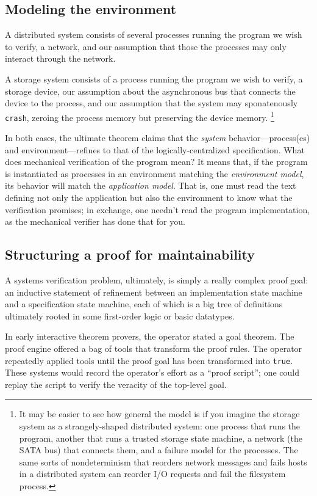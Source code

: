 \subsection{Modeling the environment}

A distributed system consists of several processes running
the program we wish to verify,
a network,
and our assumption that those the processes may only interact through
the network.

A storage system consists of a process running the program
we wish to verify,
a storage device,
our assumption about the asynchronous bus that connects the
device to the process,
and our assumption that the system may sponatenously \texttt{crash},
zeroing the process memory but preserving the device memory.
\footnote{
It may be easier to see how general the model is if you imagine
the storage system as a strangely-shaped distributed system:
one process that runs the program,
another that runs a trusted storage state machine,
a network (the SATA bus) that connects them,
and a failure model for the processes.
The same sorts of nondeterminism that reorders network messages and fails
hosts in a distributed system
can reorder I/O requests and fail the filesystem process.
}

In both cases, the ultimate theorem claims that the
\textit{system} behavior---process(es) and environment---refines
to that of the logically-centralized specification.
What does mechanical verification of the program mean?
It means that, if the program is instantiated as processes in an
environment matching the \textit{environment model},
its behavior will match the \textit{application model}.
That is, one must read the text defining not only the application
but also the environment to know what the verification promises;
in exchange, one needn't read the program implementation, as the
mechanical verifier has done that for you.

\subsection{Structuring a proof for maintainability}

A systems verification problem, ultimately, is simply a really complex
proof goal: an inductive statement of refinement between an implementation
state machine and a specification state machine, each of which is a
big tree of definitions ultimately rooted in some first-order logic or
basic datatypes.

In early interactive theorem provers, the operator stated a goal theorem.
The proof engine offered a bag of tools that transform the proof rules.
The operator repeatedly applied tools until the proof goal has been
transformed into \texttt{true}.
These systems would record the operator's effort as a ``proof script'';
one could replay the script to verify the veracity of the top-level goal.


